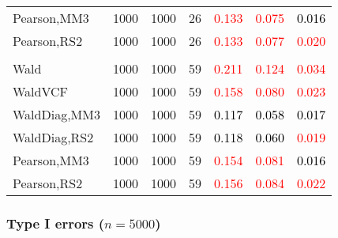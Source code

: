 \documentclass[
]{article}
\begin{document}
\begin{table}[H]
{\begin{tabular}[t]{lrrrrrr}
\hspace{1em}Pearson,MM3 & 1000 & 1000 & 26 & \textcolor{red}{0.133} & \textcolor{red}{0.075} & \textcolor{black}{0.016}\\
\hspace{1em}Pearson,RS2 & 1000 & 1000 & 26 & \textcolor{red}{0.133} & \textcolor{red}{0.077} & \textcolor{red}{0.020}\\
\addlinespace[0.3em]
\multicolumn{7}{l}{\textbf{3F 15V}}\\
\hspace{1em}Wald & 1000 & 1000 & 59 & \textcolor{red}{0.211} & \textcolor{red}{0.124} & \textcolor{red}{0.034}\\
\hspace{1em}WaldVCF & 1000 & 1000 & 59 & \textcolor{red}{0.158} & \textcolor{red}{0.080} & \textcolor{red}{0.023}\\
\hspace{1em}WaldDiag,MM3 & 1000 & 1000 & 59 & \textcolor{black}{0.117} & \textcolor{black}{0.058} & \textcolor{black}{0.017}\\
\hspace{1em}WaldDiag,RS2 & 1000 & 1000 & 59 & \textcolor{black}{0.118} & \textcolor{black}{0.060} & \textcolor{red}{0.019}\\
\hspace{1em}Pearson,MM3 & 1000 & 1000 & 59 & \textcolor{red}{0.154} & \textcolor{red}{0.081} & \textcolor{black}{0.016}\\
\hspace{1em}Pearson,RS2 & 1000 & 1000 & 59 & \textcolor{red}{0.156} & \textcolor{red}{0.084} & \textcolor{red}{0.022}\\
\bottomrule
\end{tabular}}
\endgroup{}
\end{table}

\hypertarget{type-i-errors-n5000-3}{%
\subsubsection{\texorpdfstring{Type I errors
(\(n=5000\))}{Type I errors (n=5000)}}\label{type-i-errors-n5000-3}}
\end{document}
